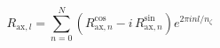 \documentclass[a4paper, 12pt]{article}
\begin{document}
\begin{equation*}
   R_{\mathrm{ax}, l}
 = \sum\limits_{n=0}^{N}
     \left( R_{\mathrm{ax}, n}^\mathrm{cos} - i \, R_{\mathrm{ax}, n}^\mathrm{sin} \right)
     e^{2 \pi i n l / n_\zeta}
\end{equation*}
\end{document}
